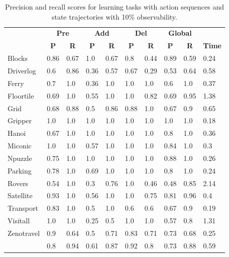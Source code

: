 \begin{table}[hbt!]
		\begin{center}
                  \begin{footnotesize}			
			\begin{tabular}{l|l|l|l|l|l|l||l|l||l|}
				& \multicolumn{2}{|c|}{\bf Pre} & \multicolumn{2}{|c|}{\bf Add} & \multicolumn{2}{|c||}{\bf Del} & \multicolumn{2}{|c|}{\bf Global} & \\ \cline{2-9}			
				& \multicolumn{1}{|c|}{\bf P} & \multicolumn{1}{|c|}{\bf R} & \multicolumn{1}{|c|}{\bf P} & \multicolumn{1}{|c|}{\bf R} & \multicolumn{1}{|c|}{\bf P} & \multicolumn{1}{|c||}{\bf R} &  \multicolumn{1}{|c|}{\bf P} & \multicolumn{1}{|c|}{\bf R} & {\bf Time} \\
				\hline
				Blocks & 0.86 & 0.67 & 1.0 & 0.67 & 0.8 & 0.44 & 0.89 & 0.59& 0.24 \\ 
				Driverlog & 0.6 & 0.86 & 0.36 & 0.57 & 0.67 & 0.29 & 0.53 & 0.64& 0.58 \\
				Ferry & 0.7 & 1.0 & 0.36 & 1.0 & 1.0 & 1.0 & 0.6 & 1.0& 0.37 \\ 
				Floortile & 0.69 & 1.0 & 0.55 & 1.0 & 1.0 & 0.82 & 0.69 & 0.95& 1.38 \\
				Grid & 0.68 & 0.88 & 0.5 & 0.86 & 0.88 & 1.0 & 0.67 & 0.9& 0.65 \\ 
				Gripper & 1.0 & 1.0 & 1.0 & 1.0 & 1.0 & 1.0 & 1.0 & 1.0& 0.18 \\ 
				Hanoi & 0.67 & 1.0 & 1.0 & 1.0 & 1.0 & 1.0 & 0.8 & 1.0& 0.36 \\
				Miconic & 1.0 & 1.0 & 0.57 & 1.0 & 1.0 & 1.0 & 0.84 & 1.0& 0.3 \\ 
				Npuzzle & 0.75 & 1.0 & 1.0 & 1.0 & 1.0 & 1.0 & 0.88 & 1.0& 0.26 \\ 
				Parking & 0.78 & 1.0 & 0.69 & 1.0 & 1.0 & 1.0 & 0.8 & 1.0& 0.24 \\
				Rovers & 0.54 & 1.0 & 0.3 & 0.76 & 1.0 & 0.46 & 0.48 & 0.85 & 2.14 \\
				Satellite & 0.93 & 1.0 & 0.56 & 1.0 & 1.0 & 0.75 & 0.81 & 0.96& 0.4 \\ 
				Transport & 0.83 & 1.0 & 0.5 & 1.0 & 0.6 & 0.6 & 0.67 & 0.9& 0.19 \\
				Visitall & 1.0 & 1.0 & 0.25 & 0.5 & 1.0 & 1.0 & 0.57 & 0.8& 1.31 \\
				Zenotravel & 0.9 & 0.64 & 0.5 & 0.71 & 0.83 & 0.71 & 0.73 & 0.68& 0.25 \\ 
				\hline
				\bf & 0.8 & 0.94 & 0.61 & 0.87 & 0.92 & 0.8 & 0.73 & 0.88 & 0.59 \\
			\end{tabular}
                  \end{footnotesize}			
		\end{center}
	\caption{\small Precision and recall scores for learning tasks with \FO action sequences and \PO state trajectories with 10\% observability.}
	\label{tab:results_minimum_100_10}
\end{table}


